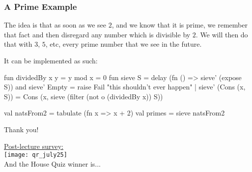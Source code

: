 \documentclass[aspectratio=169, handout]{beamer}
\begin{document}
\begin{frame}[fragile]
  \frametitle{A Prime Example}

  \ptmt

  The idea is that as soon as we see $2$, and we know that it is prime, we remember
  that fact and then disregard any number which is divisible by $2$. We will then
  do that with $3$, $5$, etc, every prime number that we see in the future.

  \pause
  \vspace{\fill}

  It can be implemented as such:
  \begin{codeblock}
    fun dividedBy x y = y mod x = 0
    fun sieve  S = delay (fn () => sieve' (expose S))
    and sieve' Empty = raise Fail "this shouldn't ever happen"
      | sieve' (Cons (x, S)) =
          Cons (x, sieve (filter (not o (dividedBy x)) S))

    val natsFrom2 = tabulate (fn x => x + 2)
    val primes = sieve natsFrom2
  \end{codeblock}
\end{frame}

\begin{frame}[plain]
	\begin{center} Thank you! \end{center}

	\begin{center}
    {\color{blue} \href{https://docs.google.com/forms/d/e/1FAIpQLSdKQ_CIcm2qnRW_gGuBgzNhg9e8Fxmj4ZFC1YJnTkPIOg8Z2Q/viewform?usp=sf_link}{Post-lecture survey:}} \\
    \vspace{5pt}
    \texttt{[image: qr\_july25]} \\
    \vspace{5pt}
    And the House Quiz winner is...
  \end{center}
\end{frame}
\end{document}
